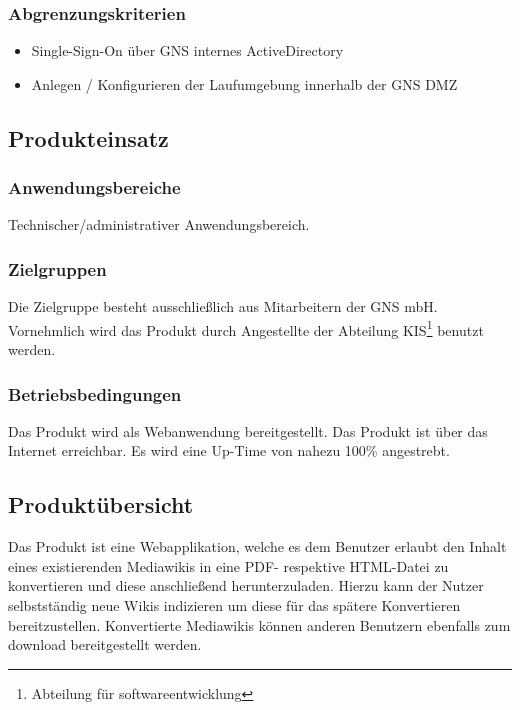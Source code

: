 	\subsubsection*{Abgrenzungskriterien}
		\begin{itemize}
			\item Single-Sign-On über GNS internes ActiveDirectory
			\item Anlegen / Konfigurieren der Laufumgebung innerhalb der GNS DMZ
		\end{itemize}

\subsection*{Produkteinsatz}

	\subsubsection*{Anwendungsbereiche}
		Technischer/administrativer Anwendungsbereich.

	\subsubsection*{Zielgruppen}
		Die Zielgruppe besteht ausschließlich aus Mitarbeitern der GNS mbH.
		Vornehmlich wird das Produkt durch Angestellte der Abteilung
		KIS\footnote{Abteilung für softwareentwicklung} benutzt werden.

	\subsubsection*{Betriebsbedingungen}
		Das Produkt wird als Webanwendung bereitgestellt. Das Produkt ist über das Internet erreichbar.
		Es wird eine Up-Time von nahezu 100\% angestrebt.


\subsection*{Produktübersicht}
	Das Produkt ist eine Webapplikation, welche es dem Benutzer erlaubt den Inhalt eines existierenden
	Mediawikis in eine PDF- respektive HTML-Datei zu konvertieren und diese anschließend herunterzuladen.
	Hierzu kann der Nutzer selbstständig neue Wikis indizieren um diese für das spätere Konvertieren
	bereitzustellen. Konvertierte Mediawikis können anderen Benutzern ebenfalls zum download bereitgestellt
	werden.

